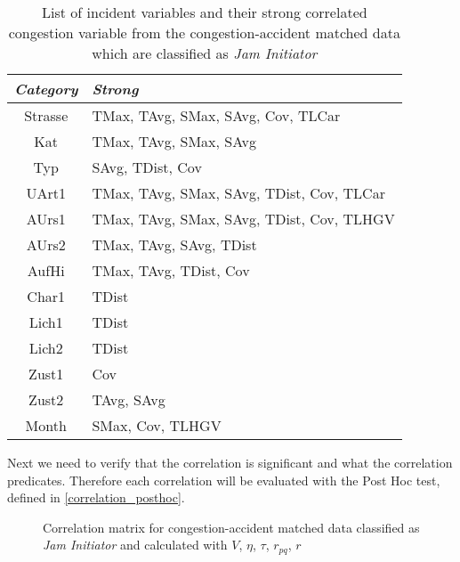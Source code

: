 \begin{table}[ht!]
	\centering
	\begin{tabular}{c|l}  
		\toprule
		\textit{Category} & \textit{Strong} \\
		\midrule
		Strasse & TMax, TAvg, SMax, SAvg, Cov, TLCar \\ 
 		Kat & TMax, TAvg, SMax, SAvg \\ %
 		Typ & SAvg, TDist, Cov \\ %
 		UArt1 & TMax, TAvg, SMax, SAvg, TDist, Cov, TLCar \\
 		AUrs1 & TMax, TAvg, SMax, SAvg, TDist, Cov, TLHGV \\ %
 		AUrs2 & TMax, TAvg, SAvg, TDist \\
 		AufHi & TMax, TAvg, TDist, Cov \\
 		Char1 & TDist \\ %
 		Lich1 & TDist \\
 		Lich2 & TDist \\ %
 		Zust1 & Cov \\
 		Zust2 & TAvg, SAvg \\ %
 		Month & SMax, Cov, TLHGV \\ %
 		\bottomrule
	\end{tabular}
	\caption{List of incident variables and their strong correlated congestion variable from the congestion-accident matched data which are classified as \textit{Jam Initiator}}
	\label{tbl:correlation_list_baysis_initiator}
\end{table}
Next we need to verify that the correlation is significant and what the correlation predicates. Therefore each correlation will be evaluated with the Post Hoc test, defined in \cref{correlation_posthoc}. 
\begin{figure}[!ht]
	\centering
	\caption{Correlation matrix for congestion-accident matched data classified as \textit{Jam Initiator} and calculated with $V$, $\eta$, $\tau$, $r_{pq}$, $r$}
	\label{img:correlation_matrix_selected_initiator_cramers}
\end{figure}

